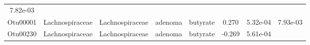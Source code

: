 \documentclass[11pt,]{article}
\begin{document}
\begin{longtable}[]{@{}cccccccc@{}}
\begin{minipage}[t]{0.08\columnwidth}
7.82e-03\strut
\end{minipage}\tabularnewline
\begin{minipage}[t]{0.08\columnwidth}\centering\strut
Otu00001\strut
\end{minipage} & \begin{minipage}[t]{0.15\columnwidth}\centering\strut
Lachnospiraceae\strut
\end{minipage} & \begin{minipage}[t]{0.15\columnwidth}\centering\strut
Lachnospiraceae\strut
\end{minipage} & \begin{minipage}[t]{0.08\columnwidth}\centering\strut
adenoma\strut
\end{minipage} & \begin{minipage}[t]{0.09\columnwidth}\centering\strut
butyrate\strut
\end{minipage} & \begin{minipage}[t]{0.07\columnwidth}\centering\strut
0.270\strut
\end{minipage} & \begin{minipage}[t]{0.08\columnwidth}\centering\strut
5.32e-04\strut
\end{minipage} & \begin{minipage}[t]{0.08\columnwidth}\centering\strut
7.93e-03\strut
\end{minipage}\tabularnewline
\begin{minipage}[t]{0.08\columnwidth}\centering\strut
Otu00230\strut
\end{minipage} & \begin{minipage}[t]{0.15\columnwidth}\centering\strut
Lachnospiraceae\strut
\end{minipage} & \begin{minipage}[t]{0.15\columnwidth}\centering\strut
Lachnospiraceae\strut
\end{minipage} & \begin{minipage}[t]{0.08\columnwidth}\centering\strut
adenoma\strut
\end{minipage} & \begin{minipage}[t]{0.09\columnwidth}\centering\strut
butyrate\strut
\end{minipage} & \begin{minipage}[t]{0.07\columnwidth}\centering\strut
-0.269\strut
\end{minipage} & \begin{minipage}[t]{0.08\columnwidth}\centering\strut
5.61e-04\strut
\end{minipage} & \begin{minipage}[t]{0.08\columnwidth}\centering\strut

\end{minipage}
\end{longtable}
\end{document}
